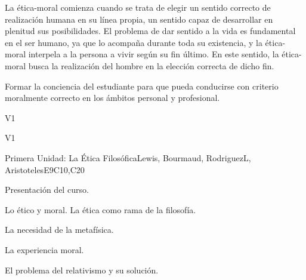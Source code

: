\begin{syllabus}


\begin{justification}
La ética-moral comienza cuando se trata de elegir un sentido correcto de realización humana en su línea propia, un sentido capaz de desarrollar en plenitud sus posibilidades.
El problema de dar sentido a la vida es fundamental en el ser humano, ya que lo acompaña durante toda su existencia, y la ética-moral interpela a la persona a vivir según su fin último. En este sentido, la ética-moral busca la realización del hombre en la elección correcta de dicho fin.
\end{justification}

\begin{goals}
\item Formar la conciencia del estudiante para que pueda conducirse con criterio moralmente correcto en los ámbitos personal y profesional.

\end{goals}

\begin{outcomes}{V1}
    \item {}
    \item {}
\end{outcomes}

\begin{competences}{V1}
    \item {}
    \item {}
    \item {}
    \item {}
\end{competences}

\begin{unit}{}{Primera Unidad: La Ética Filosófica}{Lewis, Bourmaud, RodriguezL, AristotelesE}{9}{C10,C20}
\begin{topics}
    \item Presentación del curso.
    \item Lo ético y moral. La ética como rama de la filosofía.
    \item La necesidad de la metafísica.
    \item La experiencia moral.
    \item El problema del relativismo y su solución.
	

\end{topics}
\end{unit}
\end{syllabus}
